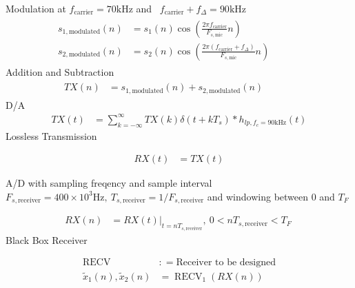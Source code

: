 \documentclass[journal]{IEEEtran}
\newcommand{\eqdef}{\mathrel{:\mathop=}}
\begin{document}
Modulation at $\displaystyle f_{\text{carrier}} =70\text{kHz}$ and \ $\displaystyle f_{\text{carrier}} +f_{\Delta } =90\text{kHz}$
\begin{align*}
    \begin{aligned}
        s_{1,\text{modulated}}( n) & =s_{1}( n)\cos\left(\frac{2\pi f_{\text{carrier}}}{F_{s,\text{mic}}} n\right)                 \\
        s_{2,\text{modulated}}( n) & =s_{2}( n)\cos\left(\frac{2\pi ( f_{\text{carrier}} +f_{\Delta })}{F_{s,\text{mic}}} n\right)
    \end{aligned} &  & \begin{aligned}
                            & \\
                            &
                       \end{aligned}
\end{align*}
Addition and Subtraction
\begin{align*}
    \begin{aligned}
        TX( n) & =s_{1,\text{modulated}}( n) +s_{2,\text{modulated}}( n)
    \end{aligned} &  & \begin{aligned}
                            & \\
                            &
                       \end{aligned}
\end{align*}
D/A
\begin{equation*}
    \begin{aligned}
        TX( t) & =\sum _{k=-\infty }^{\infty } TX( k) \delta ( t+kT_{s}) *h_{lp,f_{c} =90\text{kHz}}( t)
    \end{aligned}
\end{equation*}
Lossless Transmission


\begin{align*}
    RX( t) & =TX( t)
\end{align*}


A/D with sampling freqency and sample interval $\displaystyle F_{s,\text{receiver}} =400\times 10^{3}\text{Hz} ,\ T_{s,\text{receiver}} =1/F_{s,\text{receiver}}$ and windowing between 0 and $\displaystyle T_{F}$


\begin{align*}
    RX( n) & =RX( t)\Bigr|_{t=nT_{s,\text{receiver}}} ,\ 0< nT_{s,\text{receiver}} < T_{F} \
\end{align*}
Black Box Receiver


\begin{align*}
    \operatorname{RECV}                  & \eqdef \text{Receiver to be designed}        \\
    \tilde{x}_{1}( n) ,\tilde{x}_{2}( n) & =\operatorname{RECV}_{1}\left( RX( n)\right)
\end{align*}
\end{document}
